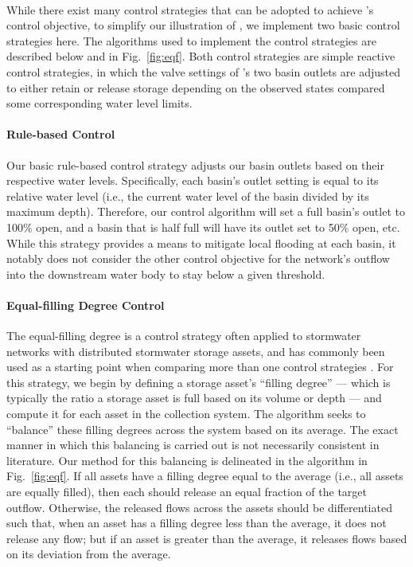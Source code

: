\

While there exist many control strategies that can be adopted to achieve 's control objective, to simplify our illustration of \pystormsNOSPACE, we implement two basic control strategies here. The algorithms used to implement the control strategies are described below and in Fig.~\ref{fig:eqf}. Both control strategies are simple reactive control strategies, in which the valve settings of 's two basin outlets are adjusted to either retain or release storage depending on the observed states compared some corresponding water level limits. 
%
%
%
\paragraph{Rule-based Control}
Our basic rule-based control strategy adjusts our basin outlets based on their respective water levels. Specifically, each basin's outlet setting is equal to its relative water level (i.e., the current water level of the basin divided by its maximum depth). Therefore, our control algorithm will set a full basin's outlet to 100\% open, and a basin that is half full will have its outlet set to 50\% open, etc. While this strategy provides a means to mitigate local flooding at each basin, it notably does not consider the other control objective for the network's outflow into the downstream water body to stay below a given threshold.
%
%
%
\paragraph{Equal-filling Degree Control}
The equal-filling degree is a control strategy often applied to stormwater networks with distributed stormwater storage assets, and has commonly been used as a starting point when comparing more than one control strategies \citep{Borsanyi2008, Campisano2000, Dirckz2011, Kroll2016, Vezzaro2014}. For this strategy, we begin by defining a storage asset's ``filling degree'' --- which is typically the ratio a storage asset is full based on its volume or depth --- and compute it for each asset in the collection system. The algorithm seeks to ``balance'' these filling degrees across the system based on its average. The exact manner in which this balancing is carried out is not necessarily consistent in literature. Our method for this balancing is delineated in the algorithm in Fig.~\ref{fig:eqf}. If all assets have a filling degree equal to the average (i.e., all assets are equally filled), then each should release an equal fraction of the target outflow. Otherwise, the released flows across the assets should be differentiated such that, when an asset has a filling degree less than the average, it does not release any flow; but if an asset is greater than the average, it releases flows based on its deviation from the average. 

